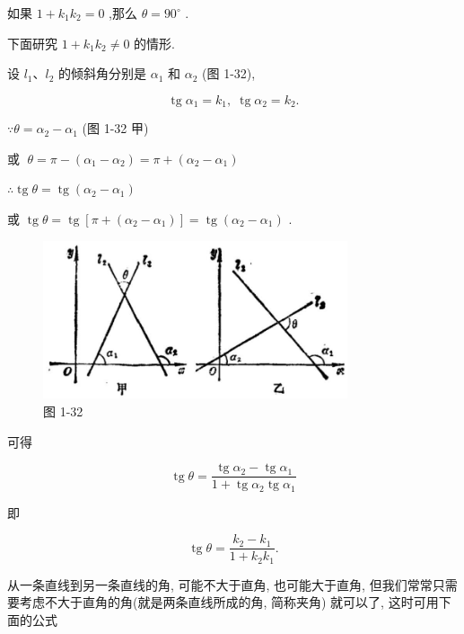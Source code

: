 \documentclass[lang=cn,newtx,10pt,scheme=chinese]{elegantbook}
\begin{document}
如果 \(1 + {k}_{1}{k}_{2} = 0\) ,那么 \(\theta = {90}^{ \circ }\) .

下面研究 \(1 + {k}_{1}{k}_{2} \neq 0\) 的情形.

设 \({l}_{1}\text{、}{l}_{2}\) 的倾斜角分别是 \({\alpha }_{1}\) 和 \({\alpha }_{2}\) (图 1-32),

\[
  \operatorname{tg}{\alpha }_{1} = {k}_{1},\;\operatorname{tg}{\alpha }_{2} = {k}_{2}.
\]

\(\because \theta = {\alpha }_{2} - {\alpha }_{1}\) (图 1-32 甲)

或 \(\;\theta = \pi - \left( {{\alpha }_{1} - {\alpha }_{2}}\right) = \pi + \left( {{\alpha }_{2} - {\alpha }_{1}}\right)\)

\(\therefore \operatorname{tg}\theta = \operatorname{tg}\left( {{\alpha }_{2} - {\alpha }_{1}}\right)\)

或 \(\operatorname{tg}\theta = \operatorname{tg}\left\lbrack {\pi + \left( {{\alpha }_{2} - {\alpha }_{1}}\right) }\right\rbrack = \operatorname{tg}\left( {{\alpha }_{2} - {\alpha }_{1}}\right)\) .

\begin{figure}[h]
  \centering
  \includegraphics[max width=0.8\textwidth]{images/01912cc2-ffb6-728e-9ae7-b113ff05c64b_47_848929.jpg}
  \caption{图 1-32}
\end{figure}



可得

\[
  \operatorname{tg}\theta = \frac{\operatorname{tg}{\alpha }_{2} - \operatorname{tg}{\alpha }_{1}}{1 + \operatorname{tg}{\alpha }_{2}\operatorname{tg}{\alpha }_{1}}
\]

即

\[
  \operatorname{tg}\theta = \frac{{k}_{2} - {k}_{1}}{1 + {k}_{2}{k}_{1}}.
\]

从一条直线到另一条直线的角, 可能不大于直角, 也可能大于直角, 但我们常常只需要考虑不大于直角的角(就是两条直线所成的角, 简称夹角) 就可以了, 这时可用下面的公式
\end{document}
